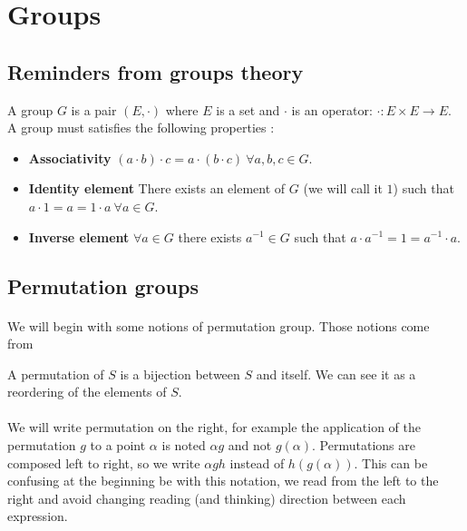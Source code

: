 \section{Groups}

\subsection{Reminders from groups theory}

\begin{definition}[Group]
  A group $G$ is a pair $(E, \cdot)$ where $E$ is a set and $\cdot$ is an operator: $\cdot: E \times E \to E$. A group must satisfies the following properties :
  \begin{itemize}
    \item \textbf{Associativity} $(a \cdot b) \cdot c = a \cdot (b \cdot c)\ \forall a,b,c \in G$.
    \item \textbf{Identity element} There exists an element of $G$ (we will call it $1$) such that $a \cdot 1 = a = 1 \cdot a \ \forall a \in G$.
    \item \textbf{Inverse element} $\forall a \in G$ there exists $a^{-1} \in G$ such that $a \cdot a^{-1} = 1 = a^{-1} \cdot a$.
  \end{itemize}
\end{definition}

\subsection{Permutation groups}

\paragraph{}
We will begin with some notions of permutation group. Those notions come from~\cite{cameronPermutationGroups}

\begin{definition}[Permutation]
  A permutation of $S$ is a bijection between $S$ and itself. We can see it as a reordering of the elements of $S$.
\end{definition}

\paragraph{}
We will write permutation on the right, for example the application of the permutation $g$ to a point $\alpha$ is noted $\alpha g$ and not $g(\alpha)$. Permutations are composed left to right, so we write $\alpha gh$ instead of $h(g(\alpha))$. This can be confusing at the beginning be with this notation, we read from the left to the right and avoid changing reading (and thinking) direction between each expression.

